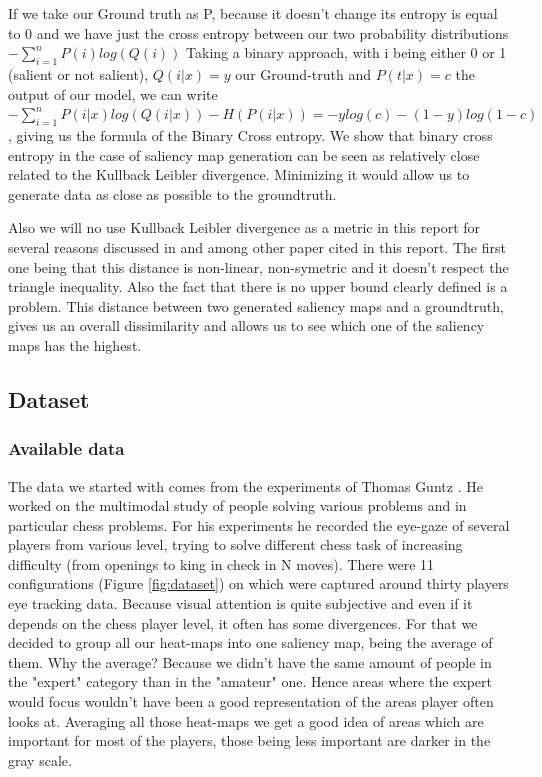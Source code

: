 If we take our Ground truth as P, because it doesn't change its entropy is equal to 0 and we have just the cross entropy between our two probability distributions $ -\sum\limits_{i=1}^n   P(i) log(Q(i)) $
Taking a binary approach, with i being either 0 or 1 (salient or not salient), $Q(i|x) = y$ our Ground-truth  and $P(t|x) = c$ the output of our model, we can write $-\sum\limits_{i=1}^n   P(i|x) log(Q(i|x)) - H(P(i|x)) = -ylog(c) - (1-y)log(1-c) $, giving us the formula of the Binary Cross entropy. 
We show that binary cross entropy in the case of saliency map generation can be seen as relatively close related to the Kullback Leibler divergence. Minimizing it would allow us to generate data as close as possible to the groundtruth.

Also we will no use Kullback Leibler divergence as a metric in this report for several reasons discussed in \cite{LeMeur2013} and \cite{metricsreview} among other paper cited in this report. The first one being that this distance is non-linear, non-symetric and it doesn't respect the triangle inequality. Also the fact that there is no upper bound clearly defined is a problem. This distance between two generated saliency maps and a groundtruth, gives us an overall dissimilarity and allows us to see which one of the saliency maps has the highest.

\subsection{Dataset}
\subsubsection{Available data} \label{section:data}
The data we started with comes from the experiments of Thomas Guntz \cite{thomasguntz}. He worked on the multimodal study of people solving various problems and in particular chess problems. For his experiments he recorded the eye-gaze of several players from various level, trying to solve different chess task of increasing difficulty (from openings to king in check in N moves). There were 11 configurations (Figure \ref{fig:dataset}) on which  were captured around thirty players eye tracking data. Because visual attention is quite subjective and even if it depends on the chess player level, it often has some divergences. For that we decided to group all our heat-maps into one saliency map, being the average of them. Why the average? Because we didn't have the  same amount of people in the "expert" category than in the "amateur" one. Hence areas where the expert would focus wouldn't have been a good representation of the areas player often looks at. Averaging all those heat-maps we get a good idea of areas which are important for most of the players, those being less important are darker in the gray scale.

